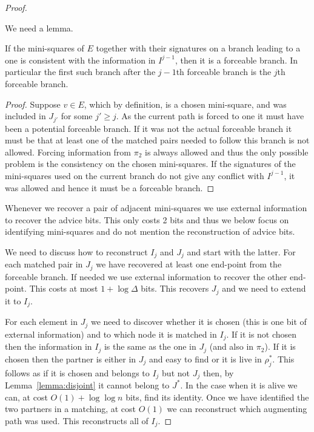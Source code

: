 \documentclass{theoretics}
\begin{document}
\begin{proof}
\begin{enumerate}
\end{enumerate}
We need a lemma.
\begin{lemma}
If the mini-squares of $E$ together with their signatures
on a branch leading to a one is consistent with the information
in $I^{j-1}$, then it is a forceable branch.  In particular the
first such branch after the $j-1$th forceable
branch is the $j$th forceable branch.
\end{lemma}

\begin{proof}
Suppose $v \in E$, which by definition, is a chosen 
mini-square, and was included in $J_{j'}$ for some $j' \geq j$.
As the current path is forced to one it must have been
a potential forceable branch.  If it was not the actual
forceable branch it must be that  at least one
of the matched pairs needed to follow this branch is not allowed.
Forcing information from $\pi_2$ is always allowed and
thus the only possible problem is the consistency on
the chosen mini-squares.  If the signatures of the
mini-squares used on the current branch do not give any conflict 
with $I^{j-1}$,  it was allowed and hence it
must be a forceable branch.
\end{proof}

Whenever we recover a pair of adjacent mini-squares
we use external information to recover the advice
bits.  This only costs 2 bits and thus we below
focus on identifying mini-squares and do not mention
the reconstruction of advice bits.  

We need to discuss how to reconstruct $I_j$ and $J_j$
and start with the latter.  For each matched
pair in $J_j$ we have recovered at least one end-point
from the forceable branch.
If needed we use external information to recover 
the other end-point.  This costs at most $1+\log \Delta$ bits.
This recovers $J_j$ and we need to extend it to $I_j$.

For each element in $J_j$ we need to discover whether it is chosen (this 
is one bit of external information) and to which node it is matched 
in $I_j$.  If it is not chosen then the information in $I_j$
is the same as the one in $J_j$ (and also in $\pi_2$).  
If it is chosen then the partner is either 
in $J_j$ and easy to find or it is live in $\rho^*_j$.
This follows as if it is chosen and belongs to $I_j$ but not $J_j$
then, by Lemma~\ref{lemma:disjoint} it cannot belong to $J^*$.
In the case when it is alive we can, at cost $O(1)+ \log \log n$ bits, find 
its identity.  Once we have identified the
two partners in a matching, at cost $O(1)$ we
can reconstruct which augmenting path was used.  This reconstructs
all of $I_j$.


\end{proof}
\end{document}
